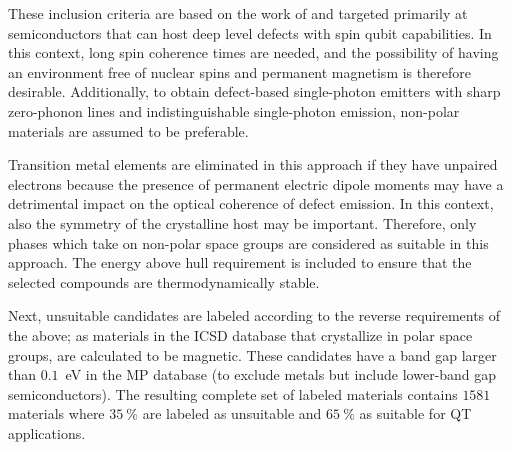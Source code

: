 \documentclass[superscriptaddress,unsortedaddress,
 amsmath,amssymb,
 aps,
]{revtex4-2}
\begin{document}
These inclusion criteria are based on the work of \citeauthor{Weber2010} \cite{Weber2010} and targeted primarily at semiconductors that can host deep level defects with spin qubit capabilities. In this context, long spin coherence times are needed, and the possibility of having an environment free of nuclear spins and permanent magnetism is therefore desirable. Additionally, to obtain defect-based single-photon emitters with sharp zero-phonon lines and indistinguishable single-photon emission, non-polar materials are assumed to be preferable. 

Transition metal elements are eliminated in this approach if they have unpaired electrons because the presence of permanent electric dipole moments may have a detrimental impact on the optical coherence of defect emission. In this context, also the symmetry of the crystalline host may be important. Therefore, only phases which take on non-polar space groups are considered as suitable in this approach. 
The energy above hull requirement is included to ensure that the selected compounds are thermodynamically stable. 

Next, unsuitable candidates are labeled according to the reverse requirements of the above; as materials in the ICSD database \cite{Allen1987,Zagorac2019} 
that crystallize in polar space groups, are calculated to be magnetic. These candidates have a band gap larger than $0.1$~eV in the MP database (to exclude metals but include lower-band gap semiconductors). 
The resulting complete set of labeled materials contains $1581$ materials where $35 \ \%$
are labeled as unsuitable and 
$65 \ \%$ as suitable for QT applications.  

\end{document}
